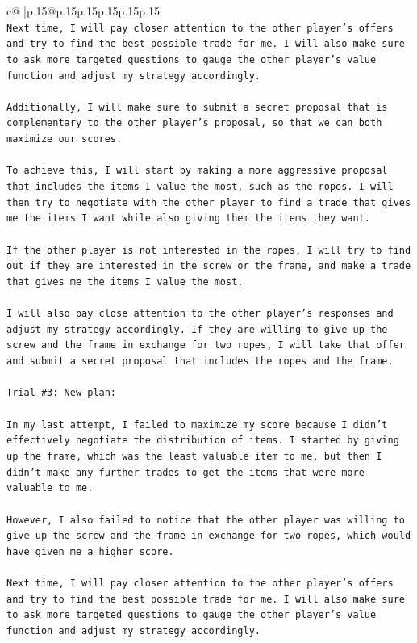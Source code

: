 \documentclass{article}
\begin{document}
{\begin{supertabular}{c@{$\;$}|p{.15\linewidth}@{}p{.15\linewidth}p{.15\linewidth}p{.15\linewidth}p{.15\linewidth}p{.15\linewidth}}
{{{\\ 
\texttt{Next time, I will pay closer attention to the other player's offers and try to find the best possible trade for me. I will also make sure to ask more targeted questions to gauge the other player's value function and adjust my strategy accordingly. } \\
\\ 
\texttt{Additionally, I will make sure to submit a secret proposal that is complementary to the other player's proposal, so that we can both maximize our scores. } \\
\\ 
\texttt{To achieve this, I will start by making a more aggressive proposal that includes the items I value the most, such as the ropes. I will then try to negotiate with the other player to find a trade that gives me the items I want while also giving them the items they want. } \\
\\ 
\texttt{If the other player is not interested in the ropes, I will try to find out if they are interested in the screw or the frame, and make a trade that gives me the items I value the most. } \\
\\ 
\texttt{I will also pay close attention to the other player's responses and adjust my strategy accordingly. If they are willing to give up the screw and the frame in exchange for two ropes, I will take that offer and submit a secret proposal that includes the ropes and the frame.} \\
\\ 
\texttt{Trial \#3: New plan: } \\
\\ 
\texttt{In my last attempt, I failed to maximize my score because I didn't effectively negotiate the distribution of items. I started by giving up the frame, which was the least valuable item to me, but then I didn't make any further trades to get the items that were more valuable to me. } \\
\\ 
\texttt{However, I also failed to notice that the other player was willing to give up the screw and the frame in exchange for two ropes, which would have given me a higher score. } \\
\\ 
\texttt{Next time, I will pay closer attention to the other player's offers and try to find the best possible trade for me. I will also make sure to ask more targeted questions to gauge the other player's value function and adjust my strategy accordingly. } \\
}}}
\end{supertabular}}
\end{document}
